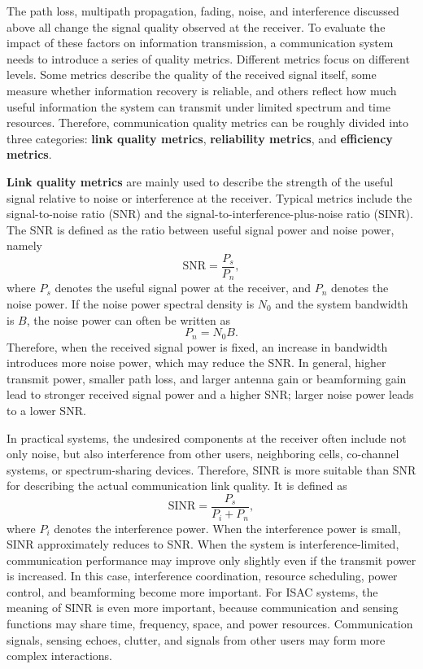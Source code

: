 
The path loss,
multipath propagation,
fading,
noise,
and interference discussed above all change the signal quality observed at the receiver.
To evaluate the impact of these factors on information transmission,
a communication system needs to introduce a series of quality metrics.
Different metrics focus on different levels.
Some metrics describe the quality of the received signal itself,
some measure whether information recovery is reliable,
and others reflect how much useful information the system can transmit under limited spectrum and time resources.
Therefore,
communication quality metrics can be roughly divided into three categories:
\textbf{link quality metrics},
\textbf{reliability metrics},
and \textbf{efficiency metrics}.

\textbf{Link quality metrics} are mainly used to describe the strength of the useful signal
relative to noise or interference at the receiver.
Typical metrics include the signal-to-noise ratio (SNR)
and the signal-to-interference-plus-noise ratio (SINR).
The SNR is defined as the ratio between useful signal power and noise power,
namely
\begin{equation}
    \mathrm{SNR}
    =
    \frac{P_s}{P_n},
    \label{eq:snr-definition}
\end{equation}
where
\(P_s\) denotes the useful signal power at the receiver,
and \(P_n\) denotes the noise power.
If the noise power spectral density is \(N_0\)
and the system bandwidth is \(B\),
the noise power can often be written as
\begin{equation}
    P_n
    =
    N_0 B.
    \label{eq:noise-power-bandwidth}
\end{equation}
Therefore,
when the received signal power is fixed,
an increase in bandwidth introduces more noise power,
which may reduce the SNR.
In general,
higher transmit power,
smaller path loss,
and larger antenna gain or beamforming gain lead to stronger received signal power
and a higher SNR;
larger noise power leads to a lower SNR.

In practical systems,
the undesired components at the receiver often include not only noise,
but also interference from other users,
neighboring cells,
co-channel systems,
or spectrum-sharing devices.
Therefore,
SINR is more suitable than SNR for describing the actual communication link quality.
It is defined as
\begin{equation}
    \mathrm{SINR}
    =
    \frac{P_s}{P_i + P_n},
    \label{eq:sinr-definition}
\end{equation}
where
\(P_i\) denotes the interference power.
When the interference power is small,
SINR approximately reduces to SNR.
When the system is interference-limited,
communication performance may improve only slightly even if the transmit power is increased.
In this case,
interference coordination,
resource scheduling,
power control,
and beamforming become more important.
For ISAC systems,
the meaning of SINR is even more important,
because communication and sensing functions may share time,
frequency,
space,
and power resources.
Communication signals,
sensing echoes,
clutter,
and signals from other users may form more complex interactions.

